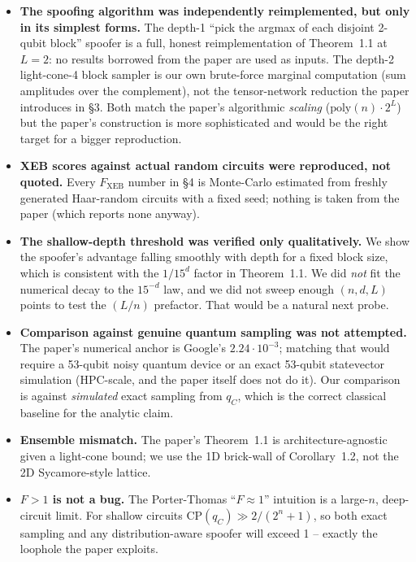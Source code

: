 \documentclass[11pt]{article}
\begin{document}
\begin{itemize}
\item \textbf{The spoofing algorithm was independently reimplemented,
  but only in its simplest forms.} The depth-1 ``pick the argmax of
  each disjoint 2-qubit block'' spoofer is a full, honest reimplementation
  of Theorem~1.1 at $L{=}2$: no results borrowed from the paper are used
  as inputs. The depth-2 light-cone-4 block sampler is our own
  brute-force marginal computation (sum amplitudes over the complement),
  not the tensor-network reduction the paper introduces in \S3. Both
  match the paper's algorithmic \emph{scaling} ($\mathrm{poly}(n)\cdot
  2^L$) but the paper's construction is more sophisticated and would be
  the right target for a bigger reproduction.
\item \textbf{XEB scores against actual random circuits were reproduced,
  not quoted.} Every $F_{\mathrm{XEB}}$ number in \S4 is Monte-Carlo
  estimated from freshly generated Haar-random circuits with a fixed
  seed; nothing is taken from the paper (which reports none anyway).
\item \textbf{The shallow-depth threshold was verified only
  qualitatively.} We show the spoofer's advantage falling smoothly with
  depth for a fixed block size, which is consistent with the $1/15^d$
  factor in Theorem~1.1. We did \emph{not} fit the numerical decay to
  the $15^{-d}$ law, and we did not sweep enough $(n,d,L)$ points to
  test the $(L/n)$ prefactor. That would be a natural next probe.
\item \textbf{Comparison against genuine quantum sampling was not
  attempted.} The paper's numerical anchor is Google's $2.24\cdot
  10^{-3}$; matching that would require a 53-qubit noisy quantum device
  or an exact 53-qubit statevector simulation (HPC-scale, and the paper
  itself does not do it). Our comparison is against \emph{simulated}
  exact sampling from $q_C$, which is the correct classical baseline
  for the analytic claim.
\item \textbf{Ensemble mismatch.} The paper's Theorem~1.1 is
  architecture-agnostic given a light-cone bound; we use the 1D
  brick-wall of Corollary~1.2, not the 2D Sycamore-style lattice.
\item \textbf{$F>1$ is not a bug.} The Porter-Thomas ``$F\approx 1$''
  intuition is a large-$n$, deep-circuit limit. For shallow circuits
  $\mathrm{CP}(q_C)\gg 2/(2^n{+}1)$, so both exact sampling and any
  distribution-aware spoofer will exceed 1 -- exactly the loophole the
  paper exploits.
\end{itemize}
\end{document}
